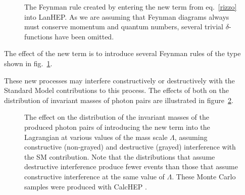 \begin{figure}[htp]\begin{center}
{\footnotesize{}
}\end{center}
\caption{The Feynman rule created by entering the new term from eq.~\eqref{rizzo} into LanHEP\cite{lanhep}. As we are assuming that Feynman diagrams always must conserve momentum and quantum numbers, several trivial $\delta$-functions have been omitted. \label{rule}}
\end{figure}

The effect of the new term is to introduce several Feynman rules of the type shown in fig.~\ref{rule}.

These new processes may interfere constructively or destructively with the Standard Model contributions to this process. The effects of both on the distribution of invariant masses of photon pairs are illustrated in figure~\ref{interf}.

\begin{figure}[htp]
\begin{minipage}[b]{.69\textwidth}
\begin{infilsf} \tiny \makebox[0pt][l]{
\hspace{-1em}
}\end{infilsf} \end{minipage}
\hfill\begin{minipage}[b]{.3\textwidth}
\caption{The effect on the distribution of the invariant masses of the produced photon pairs of introducing the new term into the Lagrangian at various values of the mass scale $\Lambda$, assuming constructive (non-grayed) and destructive (grayed) interference with the SM contribution. Note that the distributions that assume destructive interference produce fewer events than those that assume constructive interference at the same value of $\Lambda$. These Monte Carlo samples were produced with CalcHEP \cite{calchep}.
\label{interf}}
\end{minipage}
\end{figure}

